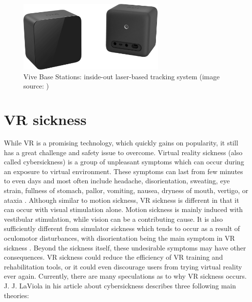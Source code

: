 \begin{figure}[th]
\centering
\includegraphics[width=0.65\textwidth]{img/base_stations.png}
\caption{Vive Base Stations: inside-out laser-based tracking system (image source: \cite{VIVE})}
\label{fig:BASE_STATIONS}
\end{figure}

\section{VR sickness}

While VR is a promising technology, which quickly gains on popularity, it still has a great challenge and safety issue to overcome. Virtual reality sickness (also called cybersickness) is a group of unpleasant symptoms which can occur during an exposure to virtual environment. These symptoms can last from few minutes to even days and most often include headache, disorientation, sweating, eye strain, fullness of stomach, pallor, vomiting, nausea, dryness of mouth, vertigo, or ataxia \cite{VRSYMPTOMSTIME}. Although similar to motion sickness, VR sickness is different in that it can occur with visual stimulation alone. Motion sickness is mainly induced with vestibular stimulation, while vision can be a contributing cause. It is also sufficiently different from simulator sickness which tends to occur as a result of oculomotor disturbances, with disorientation being the main symptom in VR sickness \cite{VRANDSIMULATORSICKNESS}. Beyond the sickness itself, these undesirable symptoms may have other consequences. VR sickness could reduce the efficiency of VR training and rehabilitation tools, or it could even discourage users from trying virtual reality ever again. Currently, there are many speculations as to why VR sickness occurs. J. J. LaViola in his article about cybersickness \cite{VRSYMPTOMS} describes three following main theories: 

